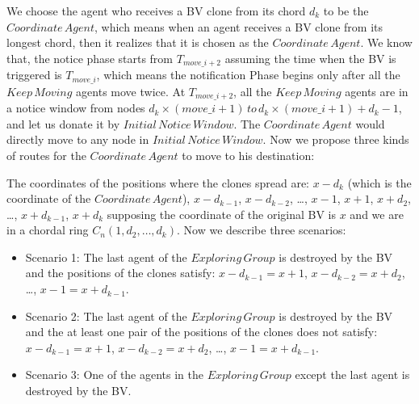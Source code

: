 
We choose the agent who receives a BV clone from its chord $d_k$ to be the $Coordinate\,Agent$, which means when an agent receives a BV clone from its longest chord, then it realizes that it is chosen as the $Coordinate\, Agent$. We know that, the notice phase starts from $T_{move\_{i+2}}$ assuming the time when the BV is triggered is $T_{move\_i}$, which means the notification Phase begins only after all the $Keep\,Moving$ agents move twice. At $T_{move\_{i+2}}$, all the $Keep\,Moving$ agents are in a notice window from nodes $d_k\times(move\_{i}+1)\,to\,d_k\times(move\_{i}+1) + d_{k}-1$, and let us donate it by $Initial\,Notice\,Window$. The $Coordinate\,Agent$ would directly move to any node in $Initial\,Notice\,Window$. Now we propose three kinds of routes for the $Coordinate\,Agent$ to move to his destination:

The coordinates of the positions where the clones spread are: $x-d_k$ (which is the coordinate of the $Coordinate\,Agent$), $x-d_{k-1}$, $x-d_{k-2}$, \ldots, $x-1$, $x+1$, $x+d_2$, \ldots, $x+d_{k-1}$, $x+d_{k}$ supposing the coordinate of the original BV is $x$ and we are in a chordal ring $C_n(1, d_2,\ldots, d_k)$.
 Now we describe three scenarios:
\begin{itemize}
\item Scenario 1: The last agent of the $Exploring\,Group$ is destroyed by the BV and the positions of the clones satisfy: $x-d_{k-1}=x+1$, $x-d_{k-2}=x+d_2$, \ldots, $x-1=x+d_{k-1}$. 
\item Scenario 2: The last agent of the $Exploring\,Group$ is destroyed by the BV and the at least one pair of the positions of the clones does not satisfy: $x-d_{k-1}=x+1$, $x-d_{k-2}=x+d_2$, \ldots, $x-1=x+d_{k-1}$. 
\item Scenario 3: One of the agents in the $Exploring\,Group$ except the last agent is destroyed by the BV.
\end{itemize}

